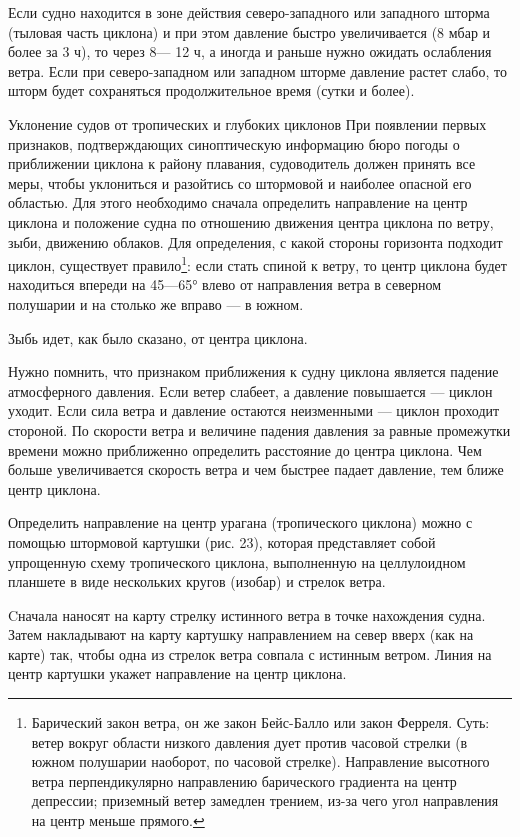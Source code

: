 Если судно находится в зоне действия северо-западного или западного шторма (тыловая часть циклона) и при этом давление быстро увеличивается (8 мбар и более за 3 ч), то через 8— 12 ч, а иногда и раньше нужно ожидать ослабления ветра. Если при северо-западном или западном шторме давление растет слабо, то шторм будет сохраняться продолжительное время (сутки и более).

Уклонение судов от тропических и глубоких циклонов
При появлении первых признаков, подтверждающих синоптическую информацию бюро погоды о приближении циклона к району плавания, судоводитель должен принять все меры, чтобы уклониться и разойтись со штормовой и наиболее опасной его областью. Для этого необходимо сначала определить направление на центр циклона и положение судна по отношению движения центра циклона по ветру, зыби, движению облаков. Для определения, с какой стороны горизонта подходит циклон, существует правило\footnote{Барический закон ветра, он же закон Бейс-Балло или закон Ферреля. Суть: ветер вокруг области низкого давления дует против часовой стрелки (в южном полушарии наоборот, по часовой стрелке). Направление высотного ветра перпендикулярно направлению барического градиента на центр депрессии; приземный ветер замедлен трением, из-за чего угол направления на центр меньше прямого.}: если стать спиной к ветру, то центр циклона будет находиться впереди на 45—65° влево от направления ветра в северном полушарии и на столько же вправо — в южном.

Зыбь идет, как было сказано, от центра циклона.

Нужно помнить, что признаком приближения к судну циклона является падение атмосферного давления. Если ветер слабеет, а давление повышается — циклон уходит. Если сила ветра и давление остаются неизменными — циклон проходит стороной. По скорости ветра и величине падения давления за равные промежутки времени можно приближенно определить расстояние до центра циклона. Чем больше увеличивается скорость ветра и чем быстрее падает давление, тем ближе центр циклона.

Определить направление на центр урагана (тропического циклона) можно с помощью штормовой картушки (рис. 23), которая представляет собой упрощенную схему тропического циклона, выполненную на целлулоидном планшете в виде нескольких кругов (изобар) и стрелок ветра.

Cначала наносят на карту стрелку истинного ветра в точке нахождения судна. Затем накладывают на карту картушку направлением на север вверх (как на карте) так, чтобы одна из стрелок ветра совпала с истинным ветром. Линия на центр картушки укажет направление на центр циклона.

